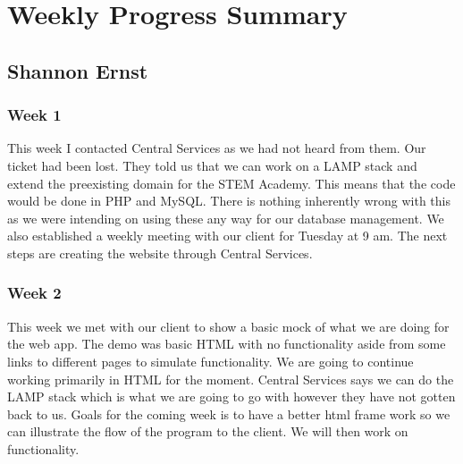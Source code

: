 \documentclass[letterpaper,10pt,serif, draftclsnofoot,onecolumn, compsoc, titlepage]{IEEEtran}
\begin{document}

\section{Weekly Progress Summary}
\subsection{Shannon Ernst}
\subsubsection{Week 1}
This week I contacted Central Services as we had not heard from them.
Our ticket had been lost.
They told us that we can work on a LAMP stack and extend the preexisting domain for the STEM Academy.
This means that the code would be done in PHP and MySQL.
There is nothing inherently wrong with this as we were intending on using these any way for our database management.
We also established a weekly meeting with our client for Tuesday at 9 am.
The next steps are creating the website through Central Services.
\subsubsection{Week 2}
This week we met with our client to show a basic mock of what we are doing for the web app. The demo was basic HTML with no 
functionality aside from some links to different pages to simulate functionality. 
We are going to continue working primarily in HTML for the moment.
Central Services says we can do the LAMP stack which is what we are going to go with however they have not gotten back to us.
Goals for the coming week is to have a better html frame work so we can illustrate the flow of the program to the client.
We will then work on functionality.
\end{document}
